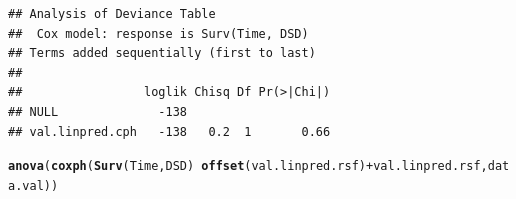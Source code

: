 \documentclass{article}\usepackage[]{graphicx}\usepackage[]{color}
\makeatletter
\newcommand{\hlopt}[1]{\textcolor[rgb]{0,0,0}{#1}}%
\newcommand{\hlstd}[1]{\textcolor[rgb]{0.345,0.345,0.345}{#1}}%
\newcommand{\hlkwd}[1]{\textcolor[rgb]{0.737,0.353,0.396}{\textbf{#1}}}%
\newenvironment{kframe}{%
 \def\at@end@of@kframe{}%
 \ifinner\ifhmode%
  \def\at@end@of@kframe{\end{minipage}}%
  \begin{minipage}{\columnwidth}%
 \fi\fi%
 \def\FrameCommand##1{\hskip\@totalleftmargin \hskip-\fboxsep
 \colorbox{shadecolor}{##1}\hskip-\fboxsep
     \hskip-\linewidth \hskip-\@totalleftmargin \hskip\columnwidth}%
 \MakeFramed {\advance\hsize-\width
   \@totalleftmargin\z@ \linewidth\hsize
   \@setminipage}}%
 {\par\unskip\endMakeFramed%
 \at@end@of@kframe}
\newenvironment{knitrout}{}{} %
\makeatother
\begin{document}
\begin{knitrout}
\begin{kframe}
\begin{alltt}
\end{alltt}
\begin{verbatim}
## Analysis of Deviance Table
##  Cox model: response is Surv(Time, DSD)
## Terms added sequentially (first to last)
## 
##                 loglik Chisq Df Pr(>|Chi|)
## NULL              -138                    
## val.linpred.cph   -138   0.2  1       0.66
\end{verbatim}
\begin{alltt}
\hlkwd{anova}\hlstd{(}\hlkwd{coxph}\hlstd{(}\hlkwd{Surv}\hlstd{(Time, DSD)} \hlopt{~} \hlkwd{offset}\hlstd{(val.linpred.rsf)} \hlopt{+} \hlstd{val.linpred.rsf, data.val))}
\end{alltt}


{\ttfamily\noindent\color{warningcolor}{\#\# Warning in fitter(X, Y, strats, offset, init, control, weights = weights, : Ran out of iterations and did not converge}}


\end{kframe}
\end{knitrout}
\end{document}

